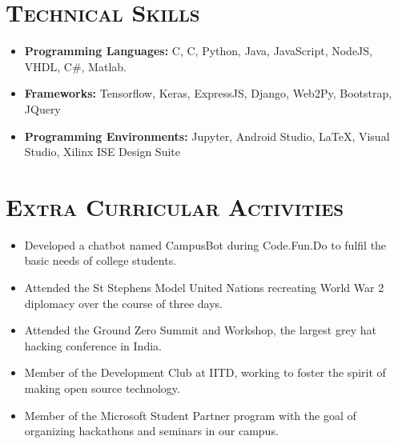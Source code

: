 \documentclass{article}
\newenvironment{longversion}{}{} %
\newcommand{\CPP}
{C\nolinebreak[4]\hspace{-.05em}\raisebox{.22ex}{\footnotesize\bf ++}}
\newcommand{\tmpsection}[1]{}
\let\tmpsection=\section
\renewcommand{\section}[1]{\tmpsection*{\textsc{#1}}}
\begin{document}
\begin{longversion}
\section{Technical Skills}\begin{itemize}
\item \textbf{Programming Languages:}  C, \CPP, Python, Java, JavaScript, NodeJS, VHDL, C\#, Matlab.
\item \textbf{Frameworks:} Tensorflow, Keras, ExpressJS, Django, Web2Py, Bootstrap, JQuery

\item \textbf{Programming Environments:} Jupyter, Android Studio, LaTeX, Visual Studio, Xilinx ISE Design Suite

\end{itemize}

\end{longversion}

\section{Extra Curricular Activities}


\begin{itemize}
    \setlength\itemsep{0em}
    
    \item Developed a chatbot named CampusBot during Code.Fun.Do to fulfil the basic needs of college students.
    \item Attended the St Stephens Model United Nations recreating World War 2 diplomacy over the course of three days.
    \item Attended the Ground Zero Summit and Workshop, the largest grey hat hacking conference in India.
    \item Member of the Development Club at IITD, working to foster the spirit of making open source technology.
    \item Member of the Microsoft Student Partner program with the goal of organizing hackathons and seminars in our campus. 
     
\end{itemize}
\end{document}
